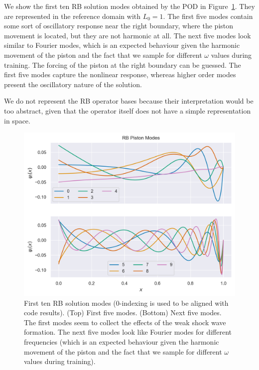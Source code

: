 \documentclass[../../thesis.tex]{subfiles}
\begin{document}
We show the first ten RB solution modes obtained by the POD 
in Figure~\ref{fig:rb_solution_modes}.
They are represented in the reference domain with $L_0=1$.
The first five modes contain some sort of oscillatory response near the right boundary,
where the piston movement is located, 
but they are not harmonic at all.
The next five modes look similar to Fourier modes, 
which is an expected behaviour given the harmonic movement of the piston
and the fact that we sample for different $\omega$ values during training.
The forcing of the piston at the right boundary can be guessed.
The first five modes capture the nonlinear response,
whereas higher order modes present the oscillatory nature of the solution.

We do not represent the RB operator bases because
their interpretation would be too abstract, 
given that the operator itself does not have a simple representation in space.

\begin{figure}[h]
    \centering
    \includegraphics[width=\columnwidth]{research_project/piston/figures/hrom/RB_basis_modes.png}
    \caption{First ten RB solution modes 
    (0-indexing is used to be aligned with code results).
    (Top) First five modes.
    (Bottom) Next five modes.
    The first modes seem to collect the effects of the weak shock wave formation.
    The next five modes look like Fourier modes for different frequencies
    (which is an expected behaviour given the harmonic movement of the piston
    and the fact that we sample for different $\omega$ values during training).
    }
    \label{fig:rb_solution_modes}
\end{figure}
\end{document}
